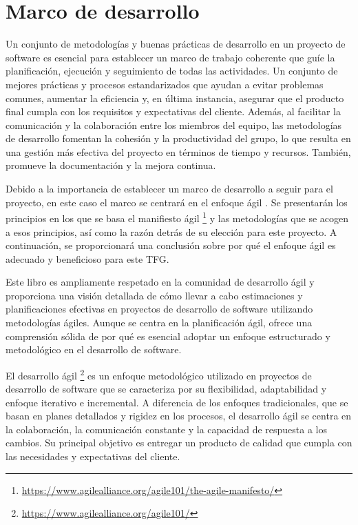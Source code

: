\section{Marco de desarrollo}

Un conjunto de metodologías y buenas prácticas de desarrollo en un proyecto de software es esencial 
para establecer un marco de trabajo coherente que guíe la planificación, ejecución y seguimiento de 
todas las actividades. Un conjunto de mejores prácticas y procesos estandarizados que 
ayudan a evitar problemas comunes, aumentar la eficiencia y, en última instancia, asegurar que el 
producto final cumpla con los requisitos y expectativas del cliente. Además, al facilitar la 
comunicación y la colaboración entre los miembros del equipo, las metodologías de desarrollo fomentan 
la cohesión y la productividad del grupo, lo que resulta en una gestión más efectiva del proyecto en 
términos de tiempo y recursos. También, promueve la documentación y la mejora continua.

Debido a la importancia de establecer un marco de desarrollo a seguir para el proyecto, en este caso el marco se
centrará en el enfoque ágil \cite{WhyAgile}. Se presentarán los principios en los que se 
basa el manifiesto ágil \footnote{\url{https://www.agilealliance.org/agile101/the-agile-manifesto/}} y 
las metodologías que se acogen a esos principios, así como la razón detrás de su elección para este 
proyecto. A continuación, se proporcionará una conclusión sobre por qué el enfoque ágil es adecuado y 
beneficioso para este TFG.

Este libro\cite{MetodDesa} es ampliamente respetado en la comunidad de desarrollo ágil y proporciona 
una visión detallada de cómo llevar a cabo estimaciones y planificaciones efectivas en proyectos de 
desarrollo de software utilizando metodologías ágiles. Aunque se centra en la planificación ágil, 
ofrece una comprensión sólida de por qué es esencial adoptar un enfoque estructurado y metodológico en 
el desarrollo de software.

El desarrollo ágil \footnote{\url{https://www.agilealliance.org/agile101/}} es un enfoque metodológico 
utilizado en proyectos de desarrollo de software que se caracteriza por su flexibilidad, adaptabilidad 
y enfoque iterativo e incremental. A diferencia de los enfoques tradicionales, que se basan en planes 
detallados y rigidez en los procesos, el desarrollo ágil se centra en la colaboración, la comunicación 
constante y la capacidad de respuesta a los cambios. Su principal objetivo es entregar un producto de 
calidad que cumpla con las necesidades y expectativas del cliente.

